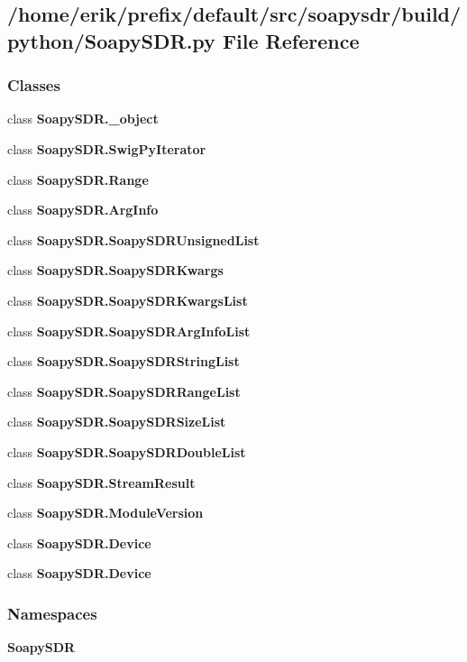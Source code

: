 \subsection{/home/erik/prefix/default/src/soapysdr/build/python/\+Soapy\+S\+DR.py File Reference}
\label{SoapySDR_8py}
\subsubsection*{Classes}
\begin{DoxyCompactItemize}
\item 
class {\bf Soapy\+S\+D\+R.\+\_\+object}
\item 
class {\bf Soapy\+S\+D\+R.\+Swig\+Py\+Iterator}
\item 
class {\bf Soapy\+S\+D\+R.\+Range}
\item 
class {\bf Soapy\+S\+D\+R.\+Arg\+Info}
\item 
class {\bf Soapy\+S\+D\+R.\+Soapy\+S\+D\+R\+Unsigned\+List}
\item 
class {\bf Soapy\+S\+D\+R.\+Soapy\+S\+D\+R\+Kwargs}
\item 
class {\bf Soapy\+S\+D\+R.\+Soapy\+S\+D\+R\+Kwargs\+List}
\item 
class {\bf Soapy\+S\+D\+R.\+Soapy\+S\+D\+R\+Arg\+Info\+List}
\item 
class {\bf Soapy\+S\+D\+R.\+Soapy\+S\+D\+R\+String\+List}
\item 
class {\bf Soapy\+S\+D\+R.\+Soapy\+S\+D\+R\+Range\+List}
\item 
class {\bf Soapy\+S\+D\+R.\+Soapy\+S\+D\+R\+Size\+List}
\item 
class {\bf Soapy\+S\+D\+R.\+Soapy\+S\+D\+R\+Double\+List}
\item 
class {\bf Soapy\+S\+D\+R.\+Stream\+Result}
\item 
class {\bf Soapy\+S\+D\+R.\+Module\+Version}
\item 
class {\bf Soapy\+S\+D\+R.\+Device}
\item 
class {\bf Soapy\+S\+D\+R.\+Device}
\end{DoxyCompactItemize}
\subsubsection*{Namespaces}
\begin{DoxyCompactItemize}
\item 
 {\bf Soapy\+S\+DR}
\end{DoxyCompactItemize}
